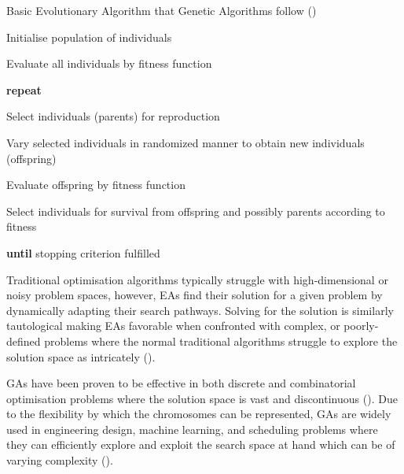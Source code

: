 \begin{algorithm}[H]
	\caption{Basic Evolutionary Algorithm that Genetic Algorithms follow (\cite{back2012handbook})}\label{alg:basic_genetic_algorithm}
	\begin{algorithmic}[1]
	\item Initialise population of individuals
	\item Evaluate all individuals  by fitness function
	\item \textbf{repeat}
	\item \quad Select individuals (parents) for reproduction
	\item \quad Vary selected individuals in randomized manner to obtain new individuals (offspring)
	\item \quad Evaluate offspring by fitness function
	\item \quad Select individuals for survival from offspring and possibly parents according to fitness
	\item \textbf{until} stopping criterion fulfilled
\end{algorithmic}
\end{algorithm}

\noindent Traditional optimisation algorithms typically struggle with high-dimensional or noisy problem spaces, however, EAs find their solution for a given problem by dynamically adapting their search pathways. Solving for the solution is similarly tautological making EAs favorable when confronted with complex, or poorly-defined problems where the normal traditional algorithms struggle to explore the solution space as intricately (\cite{intelligentOptimization}). \bigskip

\noindent GAs have been proven to be effective in both discrete and combinatorial optimisation problems where the solution space is vast and discontinuous (\cite{book_introduction_to_evolutionary_computing}). Due to the flexibility by which the chromosomes can be represented, GAs are widely used in engineering design, machine learning, and scheduling problems where they can efficiently explore and exploit the search space at hand which can be of varying complexity (\cite{back2012handbook}). \bigskip

